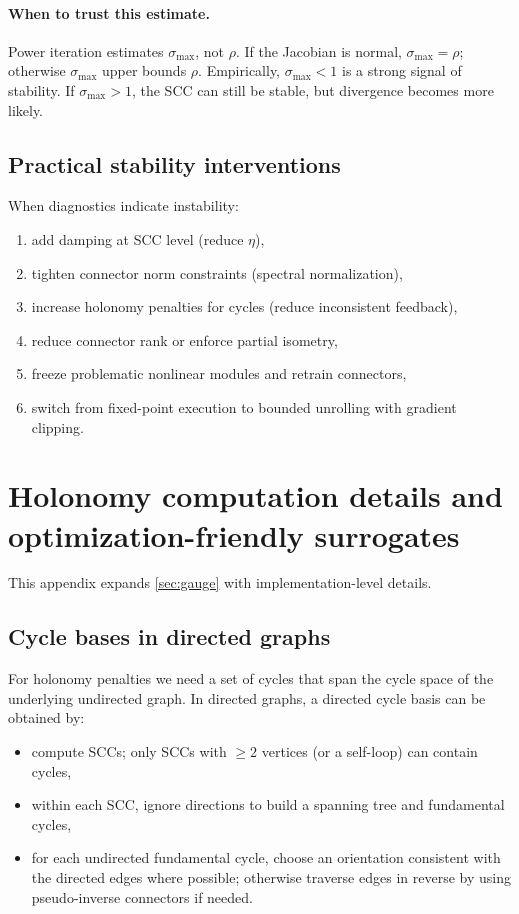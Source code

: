 \documentclass[11pt]{article}
\theoremstyle{definition}
\theoremstyle{plain}
\theoremstyle{remark}
\begin{document}
\paragraph{When to trust this estimate.}
Power iteration estimates $\sigma_{\max}$, not $\rho$.
If the Jacobian is normal, $\sigma_{\max}=\rho$; otherwise $\sigma_{\max}$ upper bounds $\rho$.
Empirically, $\sigma_{\max}<1$ is a strong signal of stability.
If $\sigma_{\max}>1$, the SCC can still be stable, but divergence becomes more likely.

\subsection{Practical stability interventions}
When diagnostics indicate instability:
\begin{enumerate}[leftmargin=2em]
\item add damping at SCC level (reduce $\eta$),
\item tighten connector norm constraints (spectral normalization),
\item increase holonomy penalties for cycles (reduce inconsistent feedback),
\item reduce connector rank or enforce partial isometry,
\item freeze problematic nonlinear modules and retrain connectors,
\item switch from fixed-point execution to bounded unrolling with gradient clipping.
\end{enumerate}

\section{Holonomy computation details and optimization-friendly surrogates}
\label{app:holonomy}

This appendix expands \cref{sec:gauge} with implementation-level details.

\subsection{Cycle bases in directed graphs}
For holonomy penalties we need a set of cycles that span the cycle space of the underlying undirected graph.
In directed graphs, a directed cycle basis can be obtained by:
\begin{itemize}[leftmargin=2em]
\item compute SCCs; only SCCs with $\ge 2$ vertices (or a self-loop) can contain cycles,
\item within each SCC, ignore directions to build a spanning tree and fundamental cycles,
\item for each undirected fundamental cycle, choose an orientation consistent with the directed edges where possible; otherwise traverse edges in reverse by using pseudo-inverse connectors if needed.
\end{itemize}
\end{document}
